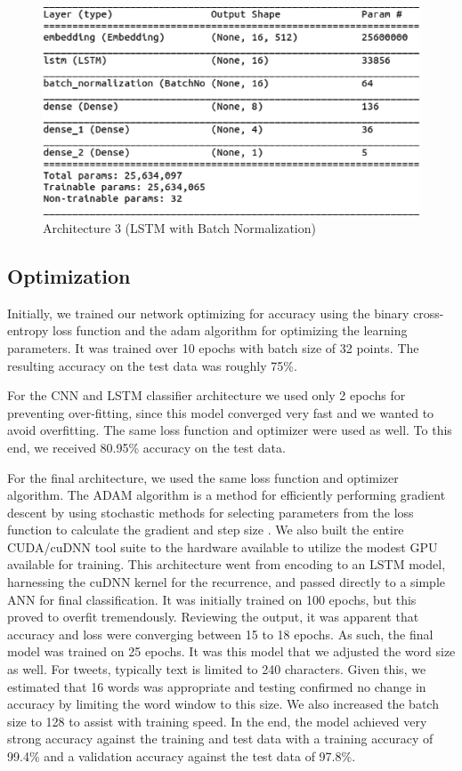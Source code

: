 \documentclass[conference]{sig-alternate-05-2015}
\begin{document}
\begin{figure}
	\centering
	\includegraphics[width=0.8\linewidth]{"withBatchNormalization"}
	\caption{Architecture 3 (LSTM with Batch Normalization)}
	\label{fig:model CNN Batch Norm}
\end{figure}

\subsection{Optimization}
Initially, we trained our network optimizing for accuracy using the binary cross-entropy loss function and the adam algorithm for optimizing the learning parameters.  It was trained over 10 epochs with batch size of 32 points. The resulting accuracy on the test data was roughly 75\%. 

For the CNN and LSTM classifier architecture we used only 2 epochs for preventing over-fitting, since this model converged very fast and we wanted to avoid overfitting.  The same loss function and optimizer were used as well. To this end, we received 80.95\% accuracy on the test data.

For the final architecture, we used the same loss function and optimizer algorithm.  The ADAM algorithm is a method for efficiently performing gradient descent by using stochastic methods for selecting parameters from the loss function to calculate the gradient and step size \cite{kingma2014adam}.  We also built the entire CUDA/cuDNN tool suite to the hardware available to utilize the modest GPU available for training.  This architecture went from encoding to an LSTM model, harnessing the cuDNN kernel for the recurrence, and passed directly to a simple ANN for final classification.  It was initially trained on 100 epochs, but this proved to overfit tremendously.  Reviewing the output, it was apparent that accuracy and loss were converging between 15 to 18 epochs.  As such, the final model was trained on 25 epochs.  It was this model that we adjusted the word size as well.  For tweets, typically text is limited to 240 characters.  Given this, we estimated that 16 words was appropriate and testing confirmed no change in accuracy by limiting the word window to this size.  We also increased the batch size to 128 to assist with training speed.  In the end, the model achieved very strong accuracy against the training and test data with a training accuracy of 99.4\% and a validation accuracy against the test data of 97.8\%.
\end{document}
